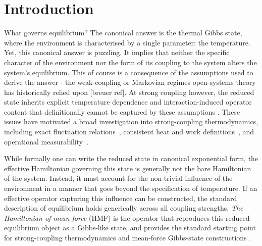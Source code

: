 \section{\label{sec:intro}Introduction}

What governs equilibrium? The canonical answer is the thermal Gibbs state, where the environment is characterised by a single parameter: the temperature. Yet, this canonical answer is puzzling. It implies that neither the specific character of the environment nor the form of its coupling to the system alters the system's equilibrium. This of course is a consequence of the assumptions used to derive the answer - the weak-coupling or Markovian regimes open-systems theory has historically relied upon [breuer ref]. At strong coupling however, the reduced state inherits explicit temperature dependence and interaction-induced operator content that definitionally cannot be captured by these assumptions \cite{hanggiFiniteQuantumDissipation2008,ingoldSpecificHeatAnomalies2009}. These issues have motivated a broad investigation into strong-coupling thermodynamics, including exact fluctuation relations~\cite{campisiFluctuationTheoremArbitrary2009,jarzynskiNonequilibriumWorkTheorem2004,gooldNonequilibriumThermodynamics2019}, consistent heat and work definitions~\cite{espositoNatureHeatStrongly2015,rivasStrongCouplingThermodynamics2020,gooldStrongCouplingFastDriving2020}, and operational measurability~\cite{strasbergMeasurabilityNonequilibriumThermodynamics2020,millerEntropyProduction2017,binderOperationalThermodynamics2019}. 

While formally one can write the reduced state in canonical exponential form, the effective Hamiltonian governing this state is generally not the bare Hamiltonian of the system. Instead, it must account for the non-trivial influence of the environment in a manner that goes beyond the specification of temperature. If an effective operator capturing this influence can be constructed, the standard description of equilibrium holds generically across all coupling strengths. \emph{The Hamiltonian of mean force} (HMF) is the operator that reproduces this reduced equilibrium object as a Gibbs-like state, and provides the standard starting point for strong-coupling thermodynamics and mean-force Gibbs-state constructions
\cite{campisiFluctuationTheoremArbitrary2009,talknerColloquiumStatisticalMechanics2020,trushechkinOpenQuantumSystem2022,seifertFirstSecondLaw2016,millerHamiltonianMeanForce2018}. 

